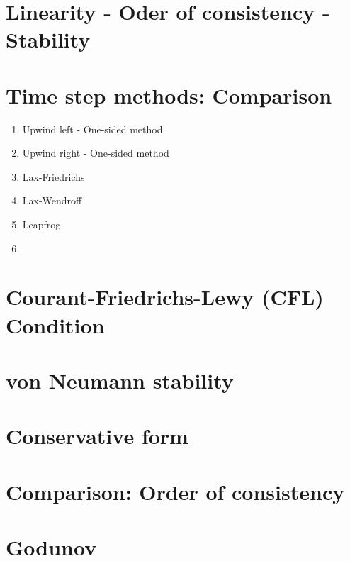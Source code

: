 \documentclass[12pt]{article}
\begin{document}
\section{Linearity - Oder of consistency - Stability}

\section{Time step methods: Comparison}
\begin{enumerate}
	\item Upwind left - One-sided method
	\item Upwind right - One-sided method
	\item Lax-Friedrichs
	\item Lax-Wendroff
	\item Leapfrog
	\item 
\end{enumerate}

\section{Courant-Friedrichs-Lewy (CFL) Condition}

\section{von Neumann stability}

\section{Conservative form}

\section{Comparison: Order of consistency}

\section{Godunov}
\end{document}
